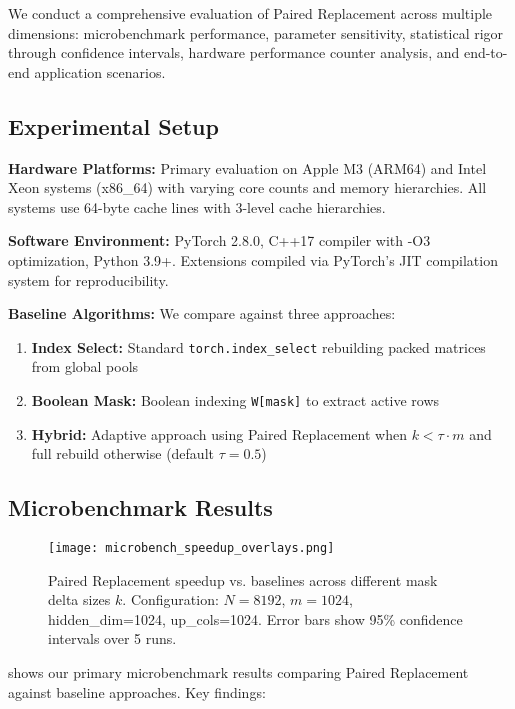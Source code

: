 \documentclass{article}
\numberwithin{equation}{section}
\theoremstyle{plain}
\theoremstyle{definition}
\theoremstyle{remark}
\begin{document}
We conduct a comprehensive evaluation of Paired Replacement across multiple dimensions: microbenchmark performance, parameter sensitivity, statistical rigor through confidence intervals, hardware performance counter analysis, and end-to-end application scenarios.

\subsection{Experimental Setup}

\textbf{Hardware Platforms:} Primary evaluation on Apple M3 (ARM64) and Intel Xeon systems (x86\_64) with varying core counts and memory hierarchies. All systems use 64-byte cache lines with 3-level cache hierarchies.

\textbf{Software Environment:} PyTorch 2.8.0, C++17 compiler with -O3 optimization, Python 3.9+. Extensions compiled via PyTorch's JIT compilation system for reproducibility.

\textbf{Baseline Algorithms:} We compare against three approaches:
\begin{enumerate}
    \item \textbf{Index Select:} Standard \texttt{torch.index\_select} rebuilding packed matrices from global pools
    \item \textbf{Boolean Mask:} Boolean indexing \texttt{W[mask]} to extract active rows  
    \item \textbf{Hybrid:} Adaptive approach using Paired Replacement when $k < \tau \cdot m$ and full rebuild otherwise (default $\tau = 0.5$)
\end{enumerate}

\subsection{Microbenchmark Results}

\begin{figure}[t]
\centering
\texttt{[image: microbench\_speedup\_overlays.png]}
\caption{Paired Replacement speedup vs. baselines across different mask delta sizes $k$. Configuration: $N=8192$, $m=1024$, hidden\_dim=1024, up\_cols=1024. Error bars show 95\% confidence intervals over 5 runs.}
\label{fig:microbench_speedup}
\end{figure}

 shows our primary microbenchmark results comparing Paired Replacement against baseline approaches. Key findings:
\end{document}
